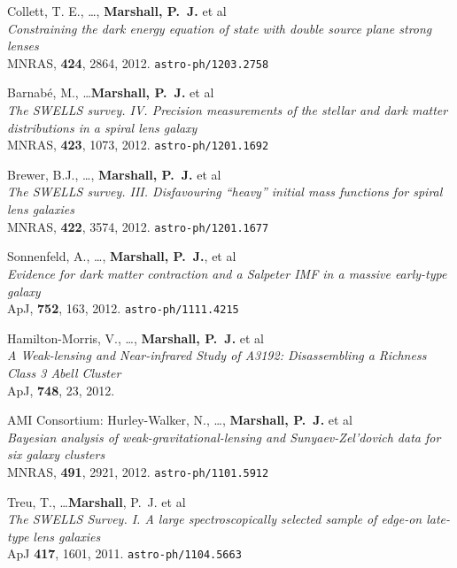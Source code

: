\begin{revnumerate}
  \item{{Collett}, T. E., \ldots, \textbf{{Marshall}, P.~J.} et al\\
  \textit{Constraining the dark energy equation of state with double source plane strong lenses}\\
  MNRAS, \textbf{424}, 2864, 2012.
  \texttt{astro-ph/1203.2758}
  }

  \item{{Barnab\'e}, M., \ldots \textbf{{Marshall}, P.~J.} et al\\
  \textit{The SWELLS survey. IV. Precision measurements of the stellar and dark matter distributions in a spiral lens galaxy}\\
  MNRAS, \textbf{423}, 1073, 2012.
  \texttt{astro-ph/1201.1692}
  }

  \item{{Brewer}, B.J., \ldots, \textbf{{Marshall}, P.~J.} et al\\
  \textit{The SWELLS survey. III. Disfavouring ``heavy'' initial mass functions for spiral lens galaxies}\\
  MNRAS, \textbf{422}, 3574, 2012.
  \texttt{astro-ph/1201.1677}
  }

  \item{{Sonnenfeld}, A., \ldots, \textbf{{Marshall}, P.~J.}, et al\\
  \textit{Evidence for dark matter contraction and a Salpeter IMF in a massive early-type galaxy}\\
  ApJ, \textbf{752}, 163, 2012.
  \texttt{astro-ph/1111.4215}
  }

  \item{{Hamilton-Morris}, V., \ldots, \textbf{{Marshall}, P.~J.} et al\\
  \textit{A Weak-lensing and Near-infrared Study of A3192: Disassembling a Richness Class 3 Abell Cluster}\\
  ApJ, \textbf{748}, 23, 2012.
  }

  \item{{AMI Consortium}: {Hurley-Walker}, N., \ldots, \textbf{{Marshall}, P.~J.} et al\\
  \textit{Bayesian analysis of weak-gravitational-lensing and Sunyaev-Zel'dovich data for six galaxy clusters}\\
  MNRAS, \textbf{491}, 2921, 2012.
  \texttt{astro-ph/1101.5912}
  }

  \item{{Treu}, T., \ldots \textbf{Marshall}, P.~J. et al\\
  \textit{The SWELLS Survey. I. A large spectroscopically selected sample of edge-on late-type lens galaxies}\\
  ApJ \textbf{417}, 1601, 2011.
  \texttt{astro-ph/1104.5663}
  }


\end{revnumerate}
